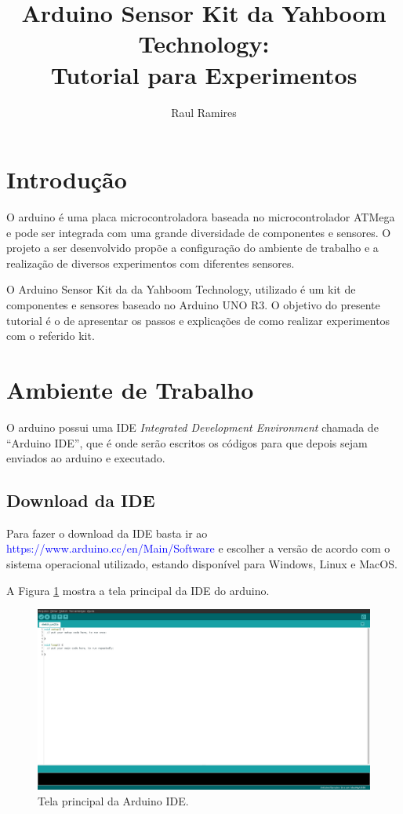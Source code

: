 \documentclass[12pt]{article}
\title{\textbf{Arduino Sensor Kit da Yahboom Technology:\\Tutorial para Experimentos}}
\author{Raul Ramires\inst{1}}
\begin{document}
 

\maketitle

\section{Introdução}
	O arduino é uma placa microcontroladora baseada no microcontrolador ATMega e pode ser integrada com uma grande diversidade de componentes e sensores. O projeto a ser desenvolvido propõe a configuração do ambiente de trabalho e a realização de diversos experimentos com diferentes sensores.

	O Arduino Sensor Kit da da Yahboom Technology, utilizado é um kit de componentes e sensores baseado no Arduino UNO R3. O objetivo do presente tutorial é o de apresentar os passos e explicações de como realizar experimentos com o referido kit. 

\section{Ambiente de Trabalho}
	O arduino possui uma IDE \textit{Integrated Development Environment} chamada de ``Arduino IDE'', que é onde serão escritos os códigos para que depois sejam enviados ao arduino e executado.

\subsection{Download da IDE}
	Para fazer o download da IDE basta ir ao \textcolor{blue}{https://www.arduino.cc/en/Main/Software} e escolher a versão de acordo com o sistema operacional utilizado, estando disponível para Windows, Linux e MacOS.

	A Figura \ref{figIDE} mostra a tela principal da IDE do arduino.

	\begin{figure}[H]
		\centering
		\includegraphics[scale=0.2]{Imagens/telaIDE.png}
		\caption{Tela principal da Arduino IDE.}
		\label{figIDE}
	\end{figure}
\end{document}
